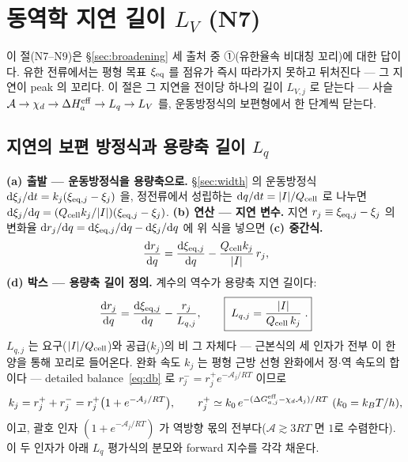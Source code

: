 \section{동역학 지연 길이 $L_V$ (N7)}\label{sec:lag}
이 절(N7--N9)은 \S\ref{sec:broadening} 세 출처 중 ①(유한율속 비대칭 꼬리)에 대한 답이다. 유한 전류에서는 평형
목표 $\xi_{\mathrm{eq}}$ 를 점유가 즉시 따라가지 못하고 뒤처진다 --- 그 지연이 peak 의 꼬리다. 이 절은 그 지연을 전이당 하나의 길이 $L_{V,j}$ 로 닫는다 --- 사슬
$\mathcal A\to\chi_d\to\Delta H_a^{\mathrm{eff}}\to L_q\to L_V$ 를, 운동방정식의 보편형에서 한 단계씩 닫는다.

\subsection{지연의 보편 방정식과 용량축 길이 $L_q$}\label{sec:lag-Lq}
\textbf{(a) 출발 --- 운동방정식을 용량축으로.} \S\ref{sec:width} 의 운동방정식 $\mathrm{d}\xi_j/\mathrm{d} t=k_j(\xi_{\mathrm{eq},j}-\xi_j)$
을, 정전류에서 성립하는 $\mathrm{d} q/\mathrm{d} t=|I|/Q_{\mathrm{cell}}$ 로 나누면 $\mathrm{d}\xi_j/\mathrm{d} q=(Q_{\mathrm{cell}} k_j/|I|)(\xi_{\mathrm{eq},j}-\xi_j)$.
\textbf{(b) 연산 --- 지연 변수.} 지연 $r_j\equiv\xi_{\mathrm{eq},j}-\xi_j$ 의 변화율 $\mathrm{d} r_j/\mathrm{d} q=\mathrm{d}\xi_{\mathrm{eq},j}/\mathrm{d} q-\mathrm{d}\xi_j/\mathrm{d} q$
에 위 식을 넣으면 \textbf{(c) 중간식.}
\begin{equation}
\frac{\mathrm{d} r_j}{\mathrm{d} q}=\frac{\mathrm{d}\xi_{\mathrm{eq},j}}{\mathrm{d} q}-\frac{Q_{\mathrm{cell}} k_j}{|I|}\,r_j,
\label{eq:Lqmid}
\end{equation}
\textbf{(d) 박스 --- 용량축 길이 정의.} 계수의 역수가 용량축 지연 길이다:
\begin{equation}
\frac{\mathrm{d} r_j}{\mathrm{d} q}=\frac{\mathrm{d}\xi_{\mathrm{eq},j}}{\mathrm{d} q}-\frac{r_j}{L_{q,j}},
\qquad \boxed{\;L_{q,j}=\frac{|I|}{Q_{\mathrm{cell}}\,k_j}\;.}
\label{eq:Lq}
\end{equation}
$L_{q,j}$ 는 요구($|I|/Q_{\mathrm{cell}}$)와 공급($k_j$)의 비 그 자체다 --- 근본식의 세 인자가 전부 이 한 양을 통해 꼬리로
들어온다. 완화 속도 $k_j$ 는 평형 근방 선형 완화에서 정$\cdot$역 속도의 합이다 --- detailed balance~\eqref{eq:db} 로
$r_j^-=r_j^+e^{-\mathcal A_j/RT}$ 이므로
\begin{equation}
k_j=r_j^++r_j^-=r_j^+\big(1+e^{-\mathcal A_j/RT}\big),
\qquad r_j^+\simeq k_0\,e^{-(\Delta G_{a,j}^{\mathrm{eff}}-\chi_d\mathcal A_j)/RT}\ (k_0=k_BT/h),
\label{eq:kuniv}
\end{equation}
이고, 괄호 인자 $(1+e^{-\mathcal A_j/RT})$ 가 역방향 몫의 전부다($\mathcal A\gtrsim3RT$ 면 $1$로 수렴한다). 이 두 인자가
아래 $L_q$ 평가식의 분모와 forward 지수를 각각 채운다.

